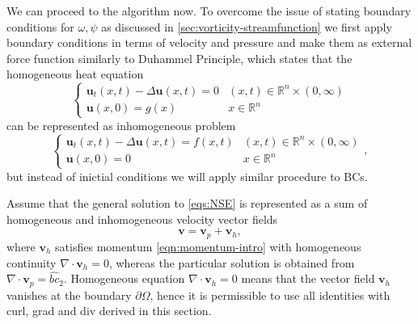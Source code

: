 \documentclass{article}
\numberwithin{equation}{section}
\begin{document}
We can proceed to the algorithm now. To overcome the issue of stating boundary conditions for $\omega,\psi$ as discussed in \cref{sec:vorticity-streamfunction} we first apply boundary conditions in terms of velocity and pressure and make them as external force function similarly to Duhammel Principle, which states that the homogeneous heat equation
$$
\begin{cases}\boldsymbol{u}_t(x, t)-\Delta \boldsymbol{u}(x, t)=0 & (x, t) \in \mathbb{R}^n \times(0, \infty) \\ \boldsymbol{u}(x, 0)=g(x) & x \in \mathbb{R}^n\end{cases}
$$
can be represented as inhomogeneous problem
$$
\begin{cases}\boldsymbol{u}_t(x, t)-\Delta \boldsymbol{u}(x, t)=f(x, t) & (x, t) \in \mathbb{R}^n \times(0, \infty) \\ \boldsymbol{u}(x, 0)=0 & x \in \mathbb{R}^n\end{cases},
$$
but instead of inictial conditions we will apply similar procedure to BCs.

Assume that the general solution to \cref{eqs:NSE} is represented as a sum of homogeneous and inhomogeneous velocity vector fields
$$\boldsymbol{v}=\boldsymbol{v}_p+\boldsymbol{v}_h,$$
where $\boldsymbol{v}_h$ satisfies momentum \cref{eqn:momentum-intro} with homogeneous continuity $\nabla\cdot \boldsymbol{v}_h=0$, whereas the particular solution is obtained from $\nabla\cdot\boldsymbol{v}_p=\hat{{bc}}_2$. Homogeneous equation $\nabla\cdot \boldsymbol{v}_h=0$ means that the vector field $\boldsymbol{v}_h$ vanishes at the boundary $\partial \Omega$, hence it is permissible to use all identities with curl, grad and div derived in this section.
\end{document}
